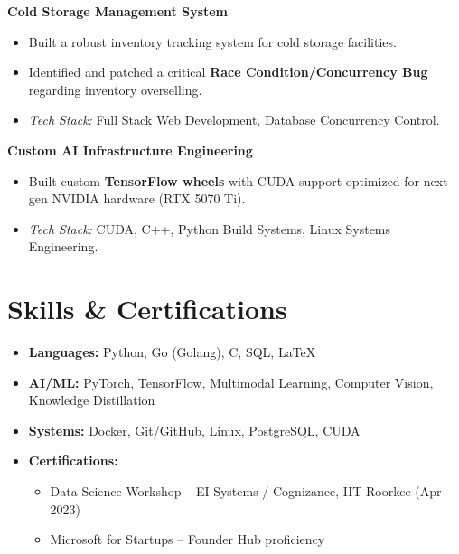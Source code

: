 \documentclass[a4paper,10pt]{article}
\newcommand{\proj}[2]{
  \noindent\textbf{#1} \hfill \textit{#2}
}
\begin{document}
\vspace{5pt}

\proj{Cold Storage Management System}{}
\begin{itemize}[noitemsep,topsep=2pt,leftmargin=15pt]
    \item Built a robust inventory tracking system for cold storage facilities.
    \item Identified and patched a critical \textbf{Race Condition/Concurrency Bug} regarding inventory overselling.
    \item \textit{Tech Stack:} Full Stack Web Development, Database Concurrency Control.
\end{itemize}

\vspace{5pt}

\proj{Custom AI Infrastructure Engineering}{}
\begin{itemize}[noitemsep,topsep=2pt,leftmargin=15pt]
    \item Built custom \textbf{TensorFlow wheels} with CUDA support optimized for next-gen NVIDIA hardware (RTX 5070 Ti).
    \item \textit{Tech Stack:} CUDA, C++, Python Build Systems, Linux Systems Engineering.
\end{itemize}

\section{Skills \& Certifications}

\begin{itemize}[noitemsep,topsep=2pt,leftmargin=15pt]
    \item \textbf{Languages:} Python, Go (Golang), C, SQL, LaTeX
    \item \textbf{AI/ML:} PyTorch, TensorFlow, Multimodal Learning, Computer Vision, Knowledge Distillation
    \item \textbf{Systems:} Docker, Git/GitHub, Linux, PostgreSQL, CUDA
    \item \textbf{Certifications:} 
    \begin{itemize}[noitemsep,topsep=0pt]
        \item Data Science Workshop – EI Systems / Cognizance, IIT Roorkee (Apr 2023)
        \item Microsoft for Startups – Founder Hub proficiency
    \end{itemize}
\end{itemize}
\end{document}
